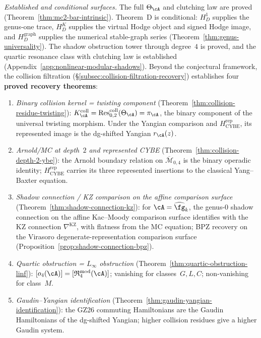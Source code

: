 \noindent\emph{Established and conditional surfaces.}
The full $\Theta_\cA$ and clutching law are proved
(Theorem~\ref{thm:mc2-bar-intrinsic}).  Theorem~D is conditional:
$H_D^1$ supplies the genus-one trace, $H_D^K$ supplies the virtual
Hodge object and signed Hodge image, and $H_D^{\mathrm{graph}}$
supplies the numerical stable-graph series
(Theorem~\ref{thm:genus-universality}).
The shadow obstruction tower through degree~$4$ is proved, and the
quartic resonance class with clutching law is established
(Appendix~\ref{app:nonlinear-modular-shadows}).
Beyond the conjectural framework, the collision filtration
(\S\ref{subsec:collision-filtration-recovery}) establishes four
\textbf{proved recovery theorems}:
\begin{enumerate}[label=\textup{(\alph*)}]
\item \emph{Binary collision kernel = twisting component}
 (Theorem~\ref{thm:collision-residue-twisting}):
 $K_\cA^{\mathrm{coll}}
 =\operatorname{Res}^{\mathrm{coll}}_{0,2}(\Theta_\cA)=\pi_\cA$,
 the binary component of the universal twisting morphism.  Under the
 Yangian comparison and $H_{\mathrm{CYBE}}^{\mathrm{rep}}$, its
 represented image is the dg-shifted Yangian $r_\cA(z)$.
\item \emph{Arnold/MC at depth~$2$ and represented CYBE}
 (Theorem~\ref{thm:collision-depth-2-ybe}): the Arnold boundary
 relation on $\overline{\mathcal{M}}_{0,4}$ is the binary operadic
 identity; $H_{\mathrm{CYBE}}^{\mathrm{rep}}$ carries its three
 represented insertions to the classical Yang--Baxter equation.
\item \emph{Shadow connection / KZ comparison on the affine comparison surface}
 (Theorem~\ref{thm:shadow-connection-kz}): for
 $\cA = \widehat{\fg}_k$, the genus-$0$ shadow connection on the
 affine Kac--Moody comparison surface identifies with the KZ connection
 $\nabla^{\mathrm{KZ}}$, with flatness from the MC equation;
 BPZ recovery on the Virasoro degenerate-representation comparison
 surface (Proposition~\ref{prop:shadow-connection-bpz}).
\item \emph{Quartic obstruction = $L_\infty$ obstruction}
 (Theorem~\ref{thm:quartic-obstruction-linf}):
 $[o_4(\cA)] = [\mathfrak{R}^{\mathrm{mod}}_4(\cA)]$;
 vanishing for classes~$G,L,C$; non-vanishing for class~$M$.
\item \emph{Gaudin--Yangian identification}
 (Theorem~\ref{thm:gaudin-yangian-identification}): the GZ26 commuting
 Hamiltonians are the Gaudin Hamiltonians of the dg-shifted Yangian;
 higher collision residues give a higher Gaudin system.

\end{enumerate}
